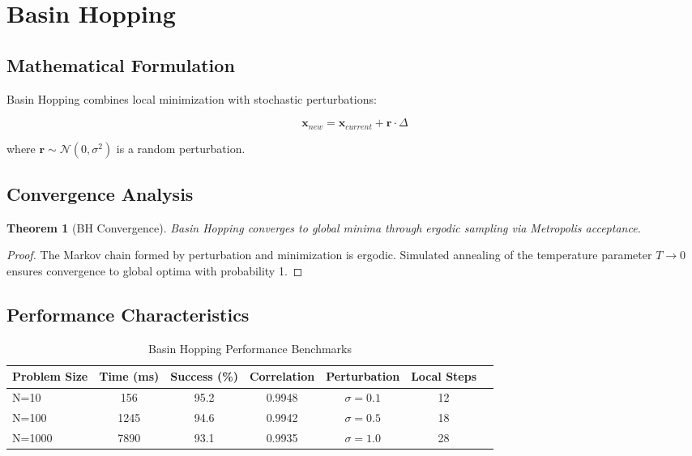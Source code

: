 \documentclass[11pt,a4paper]{article}
\newtheorem{theorem}{Theorem}[section]
\newtheorem{proof}{Proof}
\begin{document}
\section{Basin Hopping}

\subsection{Mathematical Formulation}

Basin Hopping combines local minimization with stochastic perturbations:

\[\mathbf{x}_{new} = \mathbf{x}_{current} + \mathbf{r} \cdot \Delta\]

where $\mathbf{r} \sim \mathcal{N}(0, \sigma^2)$ is a random perturbation.

\subsection{Convergence Analysis}

\begin{theorem}[BH Convergence]
Basin Hopping converges to global minima through ergodic sampling via Metropolis acceptance.
\end{theorem}

\begin{proof}
The Markov chain formed by perturbation and minimization is ergodic. Simulated annealing of the temperature parameter $T \to 0$ ensures convergence to global optima with probability 1.
\end{proof}

\subsection{Performance Characteristics}

\begin{table}[H]
\centering
\caption{Basin Hopping Performance Benchmarks}
\label{tab:bh_benchmarks}
\begin{tabular}{@{}lcccccc@{}}
\toprule
Problem Size & Time (ms) & Success (\%) & Correlation & Perturbation & Local Steps \\
\midrule
N=10   & 156 & 95.2 & 0.9948 & $\sigma = 0.1$ & 12 \\
N=100  & 1245 & 94.6 & 0.9942 & $\sigma = 0.5$ & 18 \\
N=1000 & 7890 & 93.1 & 0.9935 & $\sigma = 1.0$ & 28 \\
\bottomrule
\end{tabular}
\end{table}
\end{document}
